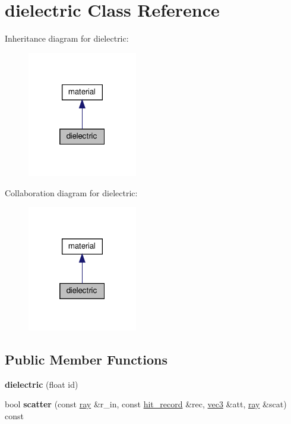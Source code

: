 \hypertarget{classdielectric}{}\section{dielectric Class Reference}
\label{classdielectric}


Inheritance diagram for dielectric\+:
\nopagebreak
\begin{figure}[H]
\begin{center}
\leavevmode
\includegraphics[width=136pt]{classdielectric__inherit__graph}
\end{center}
\end{figure}


Collaboration diagram for dielectric\+:
\nopagebreak
\begin{figure}[H]
\begin{center}
\leavevmode
\includegraphics[width=136pt]{classdielectric__coll__graph}
\end{center}
\end{figure}
\subsection*{Public Member Functions}
\begin{DoxyCompactItemize}
\item 
\mbox{\label{classdielectric_a85d94cef67b68990254c985c602a6295}} 
{\bfseries dielectric} (float id)
\item 
\mbox{\label{classdielectric_a3fc10ebe6567e530ce72463b45f88a58}} 
bool {\bfseries scatter} (const \hyperlink{classray}{ray} \&r\+\_\+in, const \hyperlink{structhit__record}{hit\+\_\+record} \&rec, \hyperlink{classvec3}{vec3} \&att, \hyperlink{classray}{ray} \&scat) const
\end{DoxyCompactItemize}
